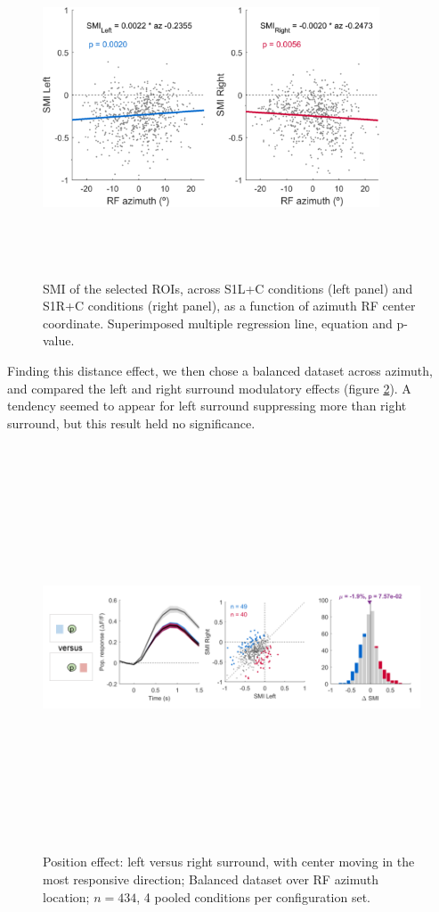 \begin{figure}[H] \centering \includegraphics[width=10cm,height=10cm,keepaspectratio]{Figures/7.Results/finalPopulation/sel/reg.png} 
\caption{SMI of the selected ROIs, across S1L+C conditions (left panel) and S1R+C conditions (right panel), as a function of azimuth RF center coordinate. Superimposed multiple regression line, equation and p-value.} \label{reg}
\end{figure}

Finding this distance effect, we then chose a balanced dataset across azimuth, and compared the left and right surround modulatory effects (figure \ref{2}). A tendency seemed to appear for left surround suppressing more than right surround, but this result held no significance.

\begin{figure}[H] \centering \includegraphics[width=12cm,height=12cm,keepaspectratio]{Figures/7.Results/finalPopulation/sel/diagrams/2.png} 
\caption{Position effect: left versus right surround, with center moving in the most responsive direction; Balanced dataset over RF azimuth location; $n=434$, 4 pooled conditions per configuration set.} \label{2}
\end{figure}

